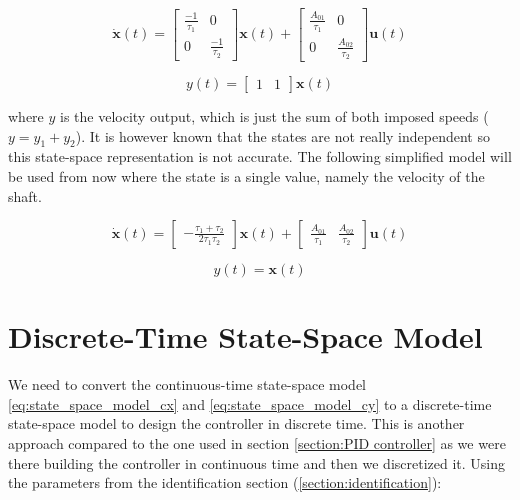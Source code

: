 \begin{equation*}
    \dot{\mathbf{x}}(t) = \begin{bmatrix}
    \frac{-1}{\tau_1} & 0 \\ 
    0 & \frac{-1}{\tau_2}
    \end{bmatrix} \mathbf{x}(t) + \begin{bmatrix} 
    \frac{A_{01}}{\tau_1} & 0\\ 
    0 & \frac{A_{02}}{\tau_2} 
    \end{bmatrix}\mathbf{u}(t)
\end{equation*}

\begin{equation}
    y(t) = \begin{bmatrix} 1 & 1 \end{bmatrix}\mathbf{x}(t)
\end{equation}

where \( y \) is the velocity output, which is just the sum of both imposed speeds ($y = y_1 + y_2$). It is however 
known that the states are not really independent so this state-space representation is not accurate. The following 
simplified model will be used from now where the state is a single value, namely the velocity of the shaft.

\begin{equation}
    \dot{\mathbf{x}}(t) = \begin{bmatrix}-\frac{\tau_1+\tau_2}{2 \tau_1 \tau_2}\end{bmatrix} \mathbf{x}(t) + 
    \begin{bmatrix} 
     \frac{A_{01}}{\tau_1} & \frac{A_{02}}{\tau_2} 
    \end{bmatrix}\mathbf{u}(t)
    \label{eq:state_space_model_cx}
\end{equation}

\begin{equation}
    y(t) = \mathbf{x}(t)
    \label{eq:state_space_model_cy}
\end{equation}

\section{Discrete-Time State-Space Model}
We need to convert the continuous-time state-space model \eqref{eq:state_space_model_cx} and 
\eqref{eq:state_space_model_cy} to a discrete-time state-space model to design the controller in discrete time. This is
another approach compared to the one used in section \ref{section:PID controller} as we were there building the 
controller in continuous time and then we discretized it. Using the parameters from the identification 
section (\ref{section:identification}):

